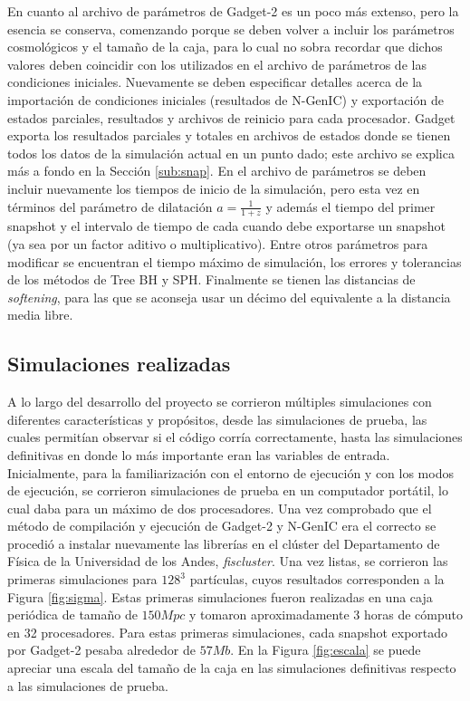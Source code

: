 En cuanto al archivo de parámetros de Gadget-2 es un poco más extenso, pero la esencia se conserva, comenzando porque se deben volver a incluir los parámetros cosmológicos y el tamaño de la caja, para lo cual no sobra recordar que dichos valores deben coincidir con los utilizados en el archivo de parámetros de las condiciones iniciales. Nuevamente se deben especificar detalles acerca de la importación de condiciones iniciales (resultados de N-GenIC) y exportación de estados parciales, resultados y archivos de reinicio para cada procesador. Gadget exporta los resultados parciales y totales en archivos de estados donde se tienen todos los datos de la simulación actual en un punto dado; este archivo se explica más a fondo en la Sección \ref{sub:snap}. En el archivo de parámetros se deben incluir nuevamente los tiempos de inicio de la simulación, pero esta vez en términos del parámetro de dilatación $a=\frac{1}{1+z}$ y además el tiempo del primer snapshot y el intervalo de tiempo de cada cuando debe exportarse un snapshot (ya sea por un factor aditivo o multiplicativo). Entre otros parámetros para modificar se encuentran el tiempo máximo de simulación, los errores y tolerancias de los métodos de Tree BH y SPH. Finalmente se tienen las distancias de \textit{softening}, para las que se aconseja usar un décimo del equivalente a la distancia media libre.

\subsection{Simulaciones realizadas}
\label{sub:simulaciones}
A lo largo del desarrollo del proyecto se corrieron múltiples simulaciones con diferentes características y propósitos, desde las simulaciones de prueba, las cuales permitían observar si el código corría correctamente, hasta las simulaciones definitivas en donde lo más importante eran las variables de entrada. Inicialmente, para la familiarización con el entorno de ejecución y con los modos de ejecución, se corrieron simulaciones de prueba en un computador portátil, lo cual daba para un máximo de dos procesadores. Una vez comprobado que el método de compilación y ejecución de Gadget-2 y N-GenIC era el correcto se procedió a instalar nuevamente las librerías en el clúster del Departamento de Física de la Universidad de los Andes, \textit{fiscluster}. Una vez listas, se corrieron las primeras simulaciones para $128^3$ partículas, cuyos resultados corresponden a la Figura \ref{fig:sigma}. Estas primeras simulaciones fueron realizadas en una caja periódica de tamaño de $150Mpc$ y tomaron aproximadamente 3 horas de cómputo en 32 procesadores. Para estas primeras simulaciones, cada snapshot exportado por Gadget-2 pesaba alrededor de $57Mb$. En la Figura \ref{fig:escala} se puede apreciar una escala del tamaño de la caja en las simulaciones definitivas respecto a las simulaciones de prueba.

